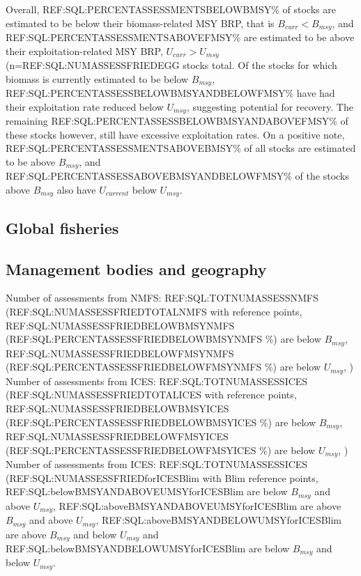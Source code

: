 Overall, REF:SQL:PERCENTASSESSMENTSBELOWBMSY\% of stocks are estimated
to be below their biomass-related MSY BRP, that is $B_{curr}<B_{msy}$,
and REF:SQL:PERCENTASSESSMENTSABOVEFMSY\% are estimated to be above
their exploitation-related MSY BRP, $U_{curr}>U_{msy}$
(n=REF:SQL:NUMASSESSFRIEDEGG stocks total.
Of the stocks for which biomass is currently estimated to be below
$B_{msy}$, REF:SQL:PERCENTASSESSBELOWBMSYANDBELOWFMSY\% have had their
exploitation rate reduced below $U_{msy}$, suggesting potential for
recovery. The remaining
REF:SQL:PERCENTASSESSBELOWBMSYANDABOVEFMSY\% of these stocks however,
still have excessive exploitation rates. On a positive note,
REF:SQL:PERCENTASSESSMENTSABOVEBMSY\% of all stocks are estimated to
be above $B_{msy}$, and REF:SQL:PERCENTASSESSABOVEBMSYANDBELOWFMSY\%
of the stocks above $B_{msy}$ also have $U_{current}$ below $U_{msy}$.


\subsection*{Global fisheries}

\subsection*{Management bodies and geography}
\noindent
Number of assessments from NMFS: REF:SQL:TOTNUMASSESSNMFS (REF:SQL:NUMASSESSFRIEDTOTALNMFS with reference points, REF:SQL:NUMASSESSFRIEDBELOWBMSYNMFS (REF:SQL:PERCENTASSESSFRIEDBELOWBMSYNMFS \%) are below $B_{msy}$, REF:SQL:NUMASSESSFRIEDBELOWFMSYNMFS (REF:SQL:PERCENTASSESSFRIEDBELOWFMSYNMFS \%) are below $U_{msy}$, ) \\

Number of assessments from ICES: REF:SQL:TOTNUMASSESSICES (REF:SQL:NUMASSESSFRIEDTOTALICES with reference points, REF:SQL:NUMASSESSFRIEDBELOWBMSYICES (REF:SQL:PERCENTASSESSFRIEDBELOWBMSYICES \%) are below $B_{msy}$, REF:SQL:NUMASSESSFRIEDBELOWFMSYICES (REF:SQL:PERCENTASSESSFRIEDBELOWFMSYICES \%) are below $U_{msy}$, ) \\

Number of assessments from ICES: REF:SQL:TOTNUMASSESSICES (REF:SQL:NUMASSESSFRIEDforICESBlim with Blim reference points, REF:SQL:belowBMSYANDABOVEUMSYforICESBlim are below $B_{msy}$ and above $U_{msy}$, REF:SQL:aboveBMSYANDABOVEUMSYforICESBlim are above $B_{msy}$ and above $U_{msy}$, REF:SQL:aboveBMSYANDBELOWUMSYforICESBlim are above $B_{msy}$ and below $U_{msy}$ and REF:SQL:belowBMSYANDBELOWUMSYforICESBlim are below $B_{msy}$ and below $U_{msy}$.

